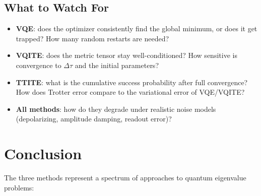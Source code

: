 \documentclass[11pt,a4paper]{article}
\begin{document}
\subsection{What to Watch For}

\begin{itemize}[nosep]
  \item \textbf{VQE}: does the optimizer consistently find the global minimum,
    or does it get trapped?  How many random restarts are needed?
  \item \textbf{VQITE}: does the metric tensor stay well-conditioned?  How
    sensitive is convergence to $\Delta\tau$ and the initial parameters?
  \item \textbf{TTITE}: what is the cumulative success probability after
    full convergence?  How does Trotter error compare to the variational
    error of VQE/VQITE?
  \item \textbf{All methods}: how do they degrade under realistic noise
    models (depolarizing, amplitude damping, readout error)?
\end{itemize}


\section{Conclusion}

The three methods represent a spectrum of approaches to quantum eigenvalue
problems:

\begin{center}
\end{center}
\end{document}
